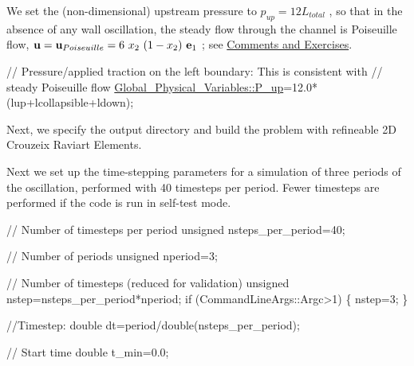 We set the (non-\/dimensional) upstream pressure to $ p_{up} = 12 L_{total }$ , so that in the absence of any wall oscillation, the steady flow through the channel is Poiseuille flow, $ {\bf u} = {\bf u}_{Poiseuille} = 6 \ x_2 \ (1-x_2) \ {\bf e}_1 $ ; see \hyperlink{index_comments}{Comments and Exercises}. 
\begin{DoxyCodeInclude}

 \textcolor{comment}{// Pressure/applied traction on the left boundary: This is consistent with }
 \textcolor{comment}{// steady Poiseuille flow}
 \hyperlink{namespaceGlobal__Physical__Variables_ae1a493695b7f4619af32f405b0b28861}{Global\_Physical\_Variables::P\_up}=12.0*(lup+lcollapsible+ldown);

\end{DoxyCodeInclude}


Next, we specify the output directory and build the problem with refineable 2D Crouzeix Raviart Elements.




Next we set up the time-\/stepping parameters for a simulation of three periods of the oscillation, performed with 40 timesteps per period. Fewer timesteps are performed if the code is run in self-\/test mode.


\begin{DoxyCodeInclude}
 

 \textcolor{comment}{// Number of timesteps per period}
 \textcolor{keywordtype}{unsigned} nsteps\_per\_period=40;

 \textcolor{comment}{// Number of periods}
 \textcolor{keywordtype}{unsigned} nperiod=3; 

 \textcolor{comment}{// Number of timesteps (reduced for validation)}
 \textcolor{keywordtype}{unsigned} nstep=nsteps\_per\_period*nperiod;
 \textcolor{keywordflow}{if} (CommandLineArgs::Argc>1)
  \{
   nstep=3;
  \}
 
 \textcolor{comment}{//Timestep: }
 \textcolor{keywordtype}{double} dt=period/double(nsteps\_per\_period);

 \textcolor{comment}{// Start time}
 \textcolor{keywordtype}{double} t\_min=0.0;

\end{DoxyCodeInclude}


